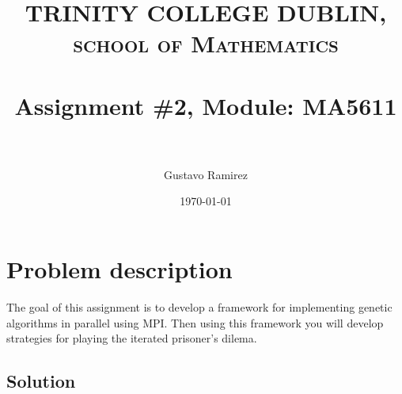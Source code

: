 \documentclass[paper=a4, fontsize=11pt]{scrartcl} %
\title{	
\normalfont \normalsize 
\textsc{TRINITY COLLEGE DUBLIN, school of Mathematics} \\ [25pt] %
\horrule{0.5pt} \\[0.4cm] %
\huge Assignment \#2, Module: MA5611 \\ %
\horrule{2pt} \\[0.5cm] %
}
\author{Gustavo Ramirez} %
\date{\normalsize\today} %
\numberwithin{equation}{section} %
\numberwithin{figure}{section} %
\numberwithin{table}{section} %
\begin{document}
\maketitle %


\section{Problem description}


The goal of this assignment is to develop a framework for implementing genetic algorithms in parallel using MPI. Then using this framework you will develop strategies for playing the iterated prisoner's dilema.



\newpage




\subsection{Solution}
\end{document}
